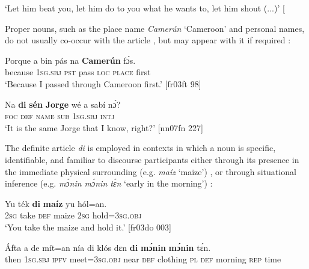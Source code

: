 \glt ‘Let him beat you, let him do to you what he wants to, let him shout (...)’ [\textstylePichiglossZchn{bo03cb 135]}
\z

Proper nouns, such as the place name \textit{Camerún} ‘Cameroon’ and personal names, do not usually co-occur with the article , but may appear with it if required : 


\ea%
    \label{ex:key:167}
    \gll Porque  a    bin  pás  na  \textbf{Camerún}    fɔ́s.\\
because  \textsc{1sg.sbj}  \textsc{pst}  pass  \textsc{loc}  \textsc{place}    first\\

\glt ‘Because I passed through Cameroon first.’ [fr03ft 98]
\z


\ea%
    \label{ex:key:168}
    \gll Na  \textbf{di}  \textbf{sén}    \textbf{Jorge}  wé    a    sabí    nɔ́?\\
\textsc{foc}\textstylePichiexamplenumberZchnZchn{} \textsc{def}  \textsc{name}\textstylePichiexamplenumberZchnZchn{} \textsc{sub}    \textsc{1sg.sbj}   \textsc{intj}\\

\glt ‘It is the same Jorge that I know, right?’ [nn07fn 227]
\z

The definite article \textit{di} is employed in contexts in which a noun is specific, identifiable, and familiar to discourse participants either through its presence in the immediate physical surrounding (e.g. \textit{maíz} ‘maize’) , or through situational inference (e.g. \textit{mɔ́nin mɔ́nin tɛ́n} ‘early in the morning’) :


\ea%
    \label{ex:key:169}
    \gll Yu  ték    \textbf{di}  \textbf{maíz}  yu  hól=an.\\
\textsc{2sg}  take    \textsc{def}  maize  \textsc{2sg}  hold=\textsc{3sg.obj}\\

\glt ‘You take the maize and hold it.’ [fr03do 003]
\z


\ea%
    \label{ex:key:170}
    \gll \'{A}fta    a    de  mít=an    nía    di  klós    dɛn \textbf{di}  \textbf{mɔ́nin}  \textbf{mɔ́nin}  tɛ́n.\\
then  \textsc{1sg.sbj}  \textsc{ipfv}  meet=\textsc{3sg.obj}  near    \textsc{def}  clothing  \textsc{pl} 
 \textsc{def}  morning  \textsc{rep}    time\\

